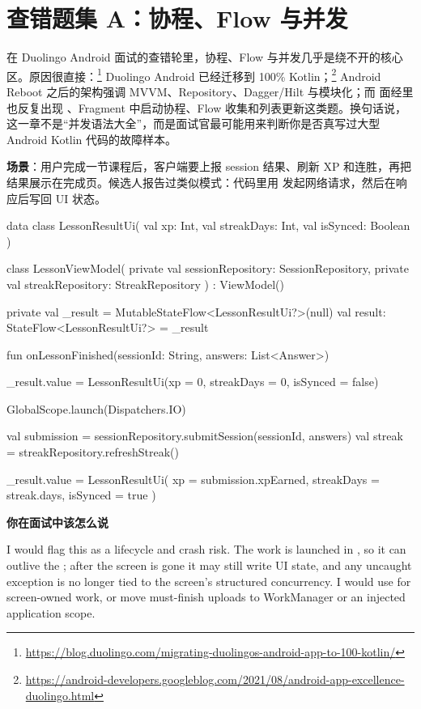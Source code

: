 \chapter{查错题集 A：协程、Flow 与并发}

在 Duolingo Android 面试的查错轮里，协程、Flow 与并发几乎是绕不开的核心区。原因很直接：\srcofficial\footnote{\url{https://blog.duolingo.com/migrating-duolingos-android-app-to-100-kotlin/}} Duolingo Android 已经迁移到 100\% Kotlin；\srcofficial\footnote{\url{https://android-developers.googleblog.com/2021/08/android-app-excellence-duolingo.html}} Android Reboot 之后的架构强调 MVVM、Repository、Dagger/Hilt 与模块化；而 \srccommunity 面经里也反复出现 、Fragment 中启动协程、Flow 收集和列表更新这类题。换句话说，这一章不是“并发语法大全”，而是面试官最可能用来判断你是否真写过大型 Android Kotlin 代码的故障样本。


\textbf{场景}：用户完成一节课程后，客户端要上报 session 结果、刷新 XP 和连胜，再把结果展示在完成页。\srccommunity 候选人报告过类似模式：代码里用  发起网络请求，然后在响应后写回 UI 状态。

\begin{ktbug}
data class LessonResultUi(
    val xp: Int,
    val streakDays: Int,
    val isSynced: Boolean
)

class LessonViewModel(
    private val sessionRepository: SessionRepository,
    private val streakRepository: StreakRepository
) : ViewModel() {

    private val _result = MutableStateFlow<LessonResultUi?>(null)
    val result: StateFlow<LessonResultUi?> = _result

    fun onLessonFinished(sessionId: String, answers: List<Answer>) {
        _result.value = LessonResultUi(xp = 0, streakDays = 0, isSynced = false)

        GlobalScope.launch(Dispatchers.IO) {
            val submission = sessionRepository.submitSession(sessionId, answers)
            val streak = streakRepository.refreshStreak()

            _result.value = LessonResultUi(
                xp = submission.xpEarned,
                streakDays = streak.days,
                isSynced = true
            )
        }
    }
}
\end{ktbug}

\textbf{你在面试中该怎么说}
\begin{sayit}[影响先行]
I would flag this as a lifecycle and crash risk. The work is launched in , so it can outlive the ; after the screen is gone it may still write UI state, and any uncaught exception is no longer tied to the screen's structured concurrency. I would use  for screen-owned work, or move must-finish uploads to WorkManager or an injected application scope.
\end{sayit}

